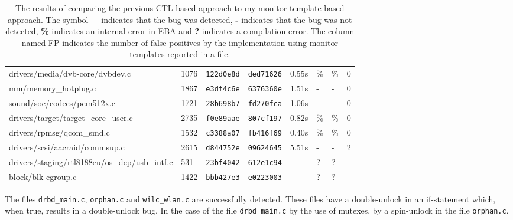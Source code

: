 \begin{table}[H]
\begin{tabular}{llllllll}
    drivers/media/dvb-core/dvbdev.c               & 1076           & \texttt{122d0e8d}   & \texttt{ded71626}   & 0.55s         & \%            & \%           & 0           \\
    mm/memory\_hotplug.c                          & 1867           & \texttt{e3df4c6e}   & \texttt{6376360e}   & 1.51s         & -             & -            & 0           \\
    sound/soc/codecs/pcm512x.c                    & 1721           & \texttt{28b698b7}   & \texttt{fd270fca}   & 1.06s         & -             & -            & 0           \\
    drivers/target/target\_core\_user.c           & 2735           & \texttt{f0e89aae}   & \texttt{807cf197}   & 0.82s         & \%            & \%           & 0           \\
    drivers/rpmsg/qcom\_smd.c                     & 1532           & \texttt{c3388a07}   & \texttt{fb416f69}   & 0.40s         & \%            & \%           & 0           \\
    drivers/scsi/aacraid/commsup.c                & 2615           & \texttt{d844752e}   & \texttt{09624645}   & 5.51s         & -             & -            & 2           \\
    drivers/staging/rtl8188eu/os\_dep/usb\_intf.c & 531            & \texttt{23bf4042}   & \texttt{612e1c94}   & -             & ?             & ?            & -           \\
    block/blk-cgroup.c                            & 1422           & \texttt{bbb427e3}   & \texttt{e0223003}   & -             & ?             & ?            & -           
    \end{tabular}
    \caption{The results of comparing the previous CTL-based approach to my monitor-template-based approach. The symbol \textbf{+} indicates that the bug was detected, \textbf{-} indicates that the bug was not detected, \textbf{\%} indicates an internal error in EBA and \textbf{?} indicates a compilation error. The column named FP indicates the number of false positives by the implementation using monitor templates reported in a file.}
    \label{evaluation-table}
\end{table}

\newpar The files \texttt{drbd\_main.c}, \texttt{orphan.c} and \texttt{wilc\_wlan.c} are successfully detected. These files have a double-unlock in an if-statement which, when true, results in a double-unlock bug. In the case of the file \texttt{drbd\_main.c} by the use of mutexes, by a spin-unlock in the file \texttt{orphan.c}. 

